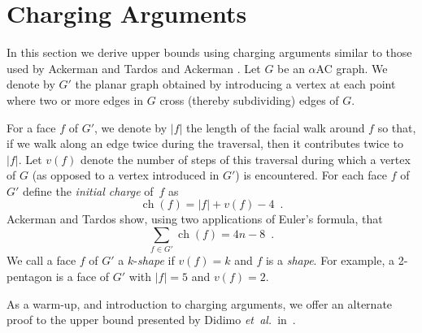 \documentclass{patmorin}
\newcommand{\etal}{\emph{et~al.}}
\DeclareMathOperator{\ch}{ch}
\newcommand{\seclabel}[1]{\label{sec:#1}}
\begin{document}
\section{Charging Arguments}
\seclabel{charging}

In this section we derive upper bounds using charging arguments similar
to those used by Ackerman and Tardos \cite{at-mneqp-07} and Ackerman
\cite{a-mnetg-09}.  Let $G$ be an $\alpha$AC graph.  We denote by $G'$
the planar graph obtained by introducing a vertex at each point where
two or more edges in $G$ cross (thereby subdividing) edges of $G$.

For a face $f$ of $G'$, we denote by $|f|$ the length of the facial walk around $f$
so that, if we walk along an edge twice during the traversal, then it contributes twice to
$|f|$.  Let $v(f)$ denote the number of steps of this traversal during
which a vertex of $G$ (as opposed to a vertex introduced in $G'$) is
encountered.  For each face $f$ of $G'$ define the \emph{initial charge}
of~$f$ as
\[
    \ch(f) = |f| + v(f) - 4  \enspace .
\]
Ackerman and Tardos show, using two applications of Euler's formula, that
\[
    \sum_{f\in G'} \ch(f) = 4n-8 \enspace .
\]
We call a face $f$ of $G'$ a $k$-\emph{shape} if $v(f)=k$ and $f$ is a
\emph{shape}.  For example, a 2-pentagon is a face of $G'$ with $|f|=5$ and
$v(f)=2$.

As a warm-up, and introduction to charging arguments, we offer an alternate
proof to the upper bound presented by Didimo \etal\ in~\cite{del-dgrac-09}.
\end{document}

